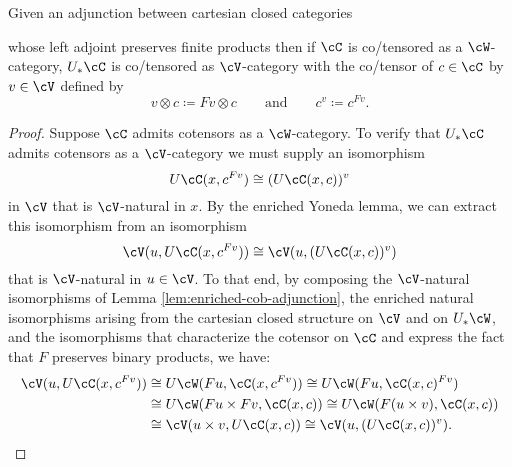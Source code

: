 \begin{proposition}\label{prop:cob-adjunction}
Given an adjunction between cartesian closed categories
\begin{center}
\end{center}
whose left adjoint preserves finite products then if $\cC$ is co/tensored as a $\cW$-cat\-e\-gory,  $U_*\cC$ is co/tensored as $\cV$-category with the co/tensor of $c \in \cC$ by $v \in \cV$ defined by
\[ v \otimes c \coloneq Fv \otimes c \qquad \text{and} \qquad c^v \coloneq c^{Fv}.\]
\end{proposition}
\begin{proof}
Suppose $\cC$ admits cotensors as a $\cW$-category. To verify that $U_*\cC$ admits cotensors as a $\cV$-category we must supply an isomorphism
\[ U\cC(x,c^{Fv}) \cong (U\cC(x,c))^v\] in $\cV$ that is $\cV$-natural in $x$. By the enriched Yoneda lemma, we can extract this isomorphism from an isomorphism \[ \cV(u,U\cC(x,c^{Fv})) \cong \cV(u,(U\cC(x,c))^v)\] that is $\cV$-natural in $u \in \cV$. To that end, by composing the $\cV$-natural isomorphisms of Lemma \ref{lem:enriched-cob-adjunction}, the enriched natural isomorphisms arising from the cartesian closed structure on $\cV$ and on $U_*\cW$, and the isomorphisms that characterize the cotensor on $\cC$ and express the fact that $F$ preserves binary products, we have:
\begin{align*} \cV(u,U\cC(x,c^{Fv})) &\cong U\cW(Fu, \cC(x,c^{Fv})) \cong U\cW(Fu, \cC(x,c)^{Fv}) \\ &\cong U\cW(Fu \times Fv, \cC(x,c))  \cong U\cW(F(u \times v), \cC(x,c)) \\ &\cong \cV(u \times v, U\cC(x,c)) \cong \cV(u, (U\cC(x,c))^v). \qedhere\end{align*}
\end{proof}




